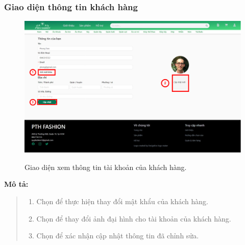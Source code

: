 \subsubsection{Giao diện thông tin khách hàng}
\begin{figure}[!htp]
    \centering
    \includegraphics[width=5in]{img/UI/new_customer/customer_info.png}
    \label{15}
    \newline
    \caption{Giao diện xem thông tin tài khoản của khách hàng.}
\end{figure}
\textbf{Mô tả:}
\begin{quote}
    \begin{enumerate}
        \item Chọn để thực hiện thay đổi mật khẩu của khách hàng.
        \item Chọn để thay đổi ảnh đại hình cho tài khoản của khách hàng.
        \item Chọn để xác nhận cập nhật thông tin đã chỉnh sửa.
    \end{enumerate}
\end{quote}

